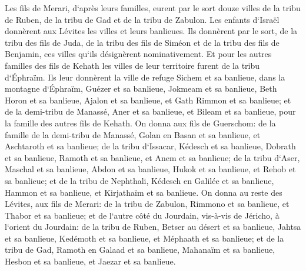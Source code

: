 \verse Les fils de Merari, d`après leurs familles, eurent par le sort douze villes de la tribu de Ruben, de la tribu de Gad et de la tribu de Zabulon. 
\verse Les enfants d`Israël donnèrent aux Lévites les villes et leurs banlieues. 
\verse Ils donnèrent par le sort, de la tribu des fils de Juda, de la tribu des fils de Siméon et de la tribu des fils de Benjamin, ces villes qu`ils désignèrent nominativement. 
\verse Et pour les autres familles des fils de Kehath les villes de leur territoire furent de la tribu d`Éphraïm. 
\verse Ils leur donnèrent la ville de refuge Sichem et sa banlieue, dans la montagne d`Éphraïm, Guézer et sa banlieue, 
\verse Jokmeam et sa banlieue, Beth Horon et sa banlieue, 
\verse Ajalon et sa banlieue, et Gath Rimmon et sa banlieue; 
\verse et de la demi-tribu de Manassé, Aner et sa banlieue, et Bileam et sa banlieue, pour la famille des autres fils de Kehath. 
\verse On donna aux fils de Guerschom: de la famille de la demi-tribu de Manassé, Golan en Basan et sa banlieue, et Aschtaroth et sa banlieue; 
\verse de la tribu d`Issacar, Kédesch et sa banlieue, Dobrath et sa banlieue, 
\verse Ramoth et sa banlieue, et Anem et sa banlieue; 
\verse de la tribu d`Aser, Maschal et sa banlieue, Abdon et sa banlieue, 
\verse Hukok et sa banlieue, et Rehob et sa banlieue; 
\verse et de la tribu de Nephthali, Kédesch en Galilée et sa banlieue, Hammon et sa banlieue, et Kirjathaïm et sa banlieue. 
\verse On donna au reste des Lévites, aux fils de Merari: de la tribu de Zabulon, Rimmono et sa banlieue, et Thabor et sa banlieue; 
\verse et de l`autre côté du Jourdain, vis-à-vis de Jéricho, à l`orient du Jourdain: de la tribu de Ruben, Betser au désert et sa banlieue, Jahtsa et sa banlieue, 
\verse Kedémoth et sa banlieue, et Méphaath et sa banlieue; 
\verse et de la tribu de Gad, Ramoth en Galaad et sa banlieue, Mahanaïm et sa banlieue, 
\verse Hesbon et sa banlieue, et Jaezar et sa banlieue. 

\chapter{}

